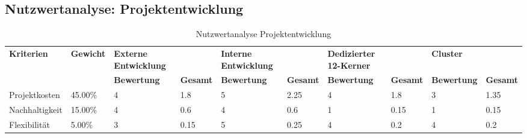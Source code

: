 \subsection{Nutzwertanalyse: Projektentwicklung}
\begin{sidewaystable}[!htp]
	\centering
	\caption{Nutzwertanalyse Projektentwicklung}
	\label{nwa:projektentwicklung}
	\begin{tabular}{llllllllll}
		\rowcolor[HTML]{9698ED}
		{\color[HTML]{FFFFFF} \textbf{Kriterien}} & {\color[HTML]{FFFFFF} \textbf{Gewicht}} & {\color[HTML]{FFFFFF} \textbf{Externe Entwicklung}} & {\color[HTML]{FFFFFF} \textbf{}}       & {\color[HTML]{FFFFFF} \textbf{Interne Entwicklung}} & {\color[HTML]{FFFFFF} \textbf{}}       & {\color[HTML]{FFFFFF} \textbf{Dedizierter 12-Kerner}} & {\color[HTML]{FFFFFF} \textbf{}}       & {\color[HTML]{FFFFFF} \textbf{Cluster}}   & {\color[HTML]{FFFFFF} \textbf{}}       \\
		\rowcolor[HTML]{9698ED}
		{\color[HTML]{FFFFFF} \textbf{}}          & {\color[HTML]{FFFFFF} \textbf{}}        & {\color[HTML]{FFFFFF} \textbf{Bewertung}}           & {\color[HTML]{FFFFFF} \textbf{Gesamt}} & {\color[HTML]{FFFFFF} \textbf{Bewertung}}           & {\color[HTML]{FFFFFF} \textbf{Gesamt}} & {\color[HTML]{FFFFFF} \textbf{Bewertung}}             & {\color[HTML]{FFFFFF} \textbf{Gesamt}} & {\color[HTML]{FFFFFF} \textbf{Bewertung}} & {\color[HTML]{FFFFFF} \textbf{Gesamt}} \\
		Projektkosten                             & 45.00\%                                 & 4                                                   & 1.8                                    & 5                                                   & 2.25                                   & 4                                                     & 1.8                                    & 3                                         & 1.35                                   \\
		\rowcolor[HTML]{BBDAFF}
		Nachhaltigkeit                            & 15.00\%                                 & 4                                                   & 0.6                                    & 4                                                   & 0.6                                    & 1                                                     & 0.15                                   & 1                                         & 0.15                                   \\
		Flexibilität                              & 5.00\%                                  & 3                                                   & 0.15                                   & 5                                                   & 0.25                                   & 4                                                     & 0.2                                    & 4                                         & 0.2                                    \\

\end{tabular}
\end{sidewaystable}
